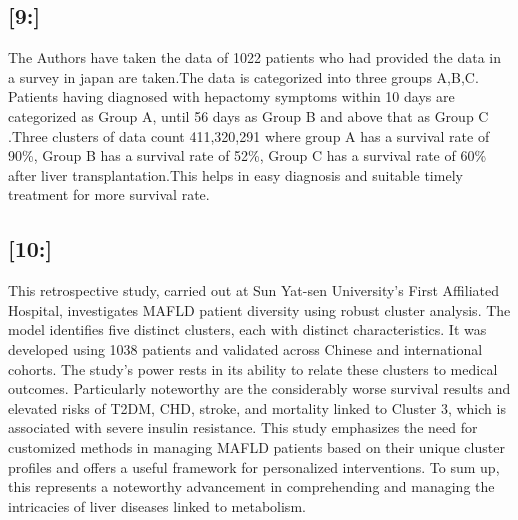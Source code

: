\documentclass{article}
\begin{document}
\begin{multicols}{2}
\subsection{[9:]}
The Authors have taken the data of 1022 patients who had provided the data in a survey in japan are taken.The data is categorized into three groups A,B,C. Patients having diagnosed with hepactomy symptoms within 10 days are categorized as Group A, until 56 days as Group B and above that as Group C .Three clusters of data count 411,320,291 where group A has a survival rate of 90\%, Group B has a survival rate of 52\%, Group C has a survival rate of 60\% after liver transplantation.This helps in easy diagnosis and suitable timely treatment for more survival rate.
\subsection{[10:]}
This retrospective study, carried out at Sun Yat-sen University's First Affiliated Hospital, investigates MAFLD patient diversity using robust cluster analysis. The model identifies five distinct clusters, each with distinct characteristics. It was developed using 1038 patients and validated across Chinese and international cohorts.
The study's power rests in its ability to relate these clusters to medical outcomes. Particularly noteworthy are the considerably worse survival results and elevated risks of T2DM, CHD, stroke, and mortality linked to Cluster 3, which is associated with severe insulin resistance.
This study emphasizes the need for customized methods in managing MAFLD patients based on their unique cluster profiles and offers a useful framework for personalized interventions. To sum up, this represents a noteworthy advancement in comprehending and managing the intricacies of liver diseases linked to metabolism.

\end{multicols}
\end{document}
